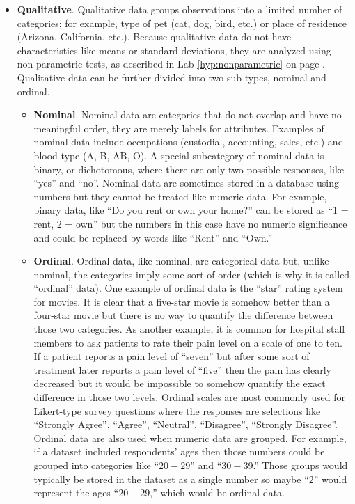 \begin{itemize}

  \item \textbf{Qualitative}. Qualitative data groups observations into a limited number of categories; for example, type of pet (cat, dog, bird, etc.) or place of residence (Arizona, California, etc.). Because qualitative data do not have characteristics like means or standard deviations, they are analyzed using non-parametric tests, as described in Lab \ref{hyp:nonparametric} on page \pageref{hyp:nonparametric}. Qualitative data can be further divided into two sub-types, nominal and ordinal.
  
  \begin{itemize}
    \item \textbf{Nominal}. Nominal data are categories that do not overlap and have no meaningful order, they are merely labels for attributes. Examples of nominal data include occupations (custodial, accounting, sales, etc.) and blood type (A, B, AB, O). A special subcategory of nominal data is binary, or dichotomous, where there are only two possible responses, like ``yes'' and ``no''. Nominal data are sometimes stored in a database using numbers but they cannot be treated like numeric data. For example, binary data, like ``Do you rent or own your home?'' can be stored as ``1 = rent, 2 = own'' but the numbers in this case have no numeric significance and could be replaced by words like ``Rent'' and ``Own.''
    
    \item \textbf{Ordinal}. Ordinal data, like nominal, are categorical data but, unlike nominal, the categories imply some sort of order (which is why it is called ``ordinal'' data). One example of ordinal data is the ``star'' rating system for movies. It is clear that a five-star movie is somehow better than a four-star movie but there is no way to quantify the difference between those two categories. As another example, it is common for hospital staff members to ask patients to rate their pain level on a scale of one to ten. If a patient reports a pain level of ``seven'' but after some sort of treatment later reports a pain level of ``five'' then the pain has clearly decreased but it would be impossible to somehow quantify the exact difference in those two levels. Ordinal scales are most commonly used for Likert-type survey questions where the responses are selections like ``Strongly Agree'', ``Agree'', ``Neutral'', ``Disagree'', ``Strongly Disagree''. Ordinal data are also used when numeric data are grouped. For example, if a dataset included respondents' ages then those numbers could be grouped into categories like ``$ 20-29 $'' and ``$ 30-39 $.'' Those groups would typically be stored in the dataset as a single number so maybe ``$ 2 $'' would represent the ages ``$ 20-29 $,'' which would be ordinal data.
  \end{itemize}


\end{itemize}
